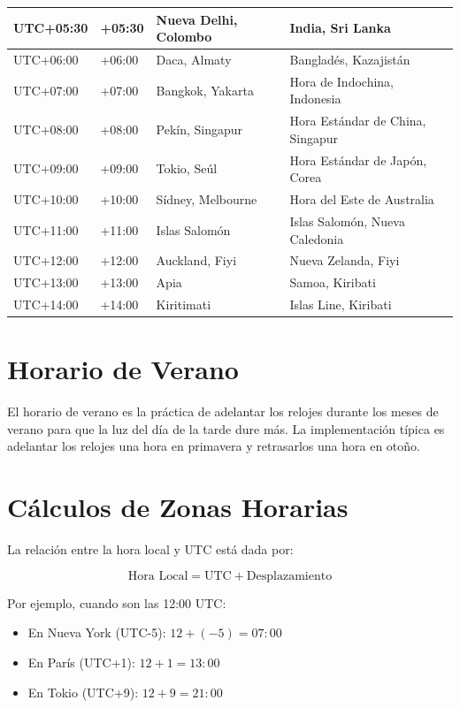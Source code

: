 \documentclass[12pt]{article}
\begin{document}
\begin{longtable}{|p{3cm}|p{2cm}|p{3cm}|p{5cm}|}
\hline
UTC+05:30 & +05:30 & Nueva Delhi, Colombo & India, Sri Lanka \\
\hline
UTC+06:00 & +06:00 & Daca, Almaty & Bangladés, Kazajistán \\
\hline
UTC+07:00 & +07:00 & Bangkok, Yakarta & Hora de Indochina, Indonesia \\
\hline
UTC+08:00 & +08:00 & Pekín, Singapur & Hora Estándar de China, Singapur \\
\hline
UTC+09:00 & +09:00 & Tokio, Seúl & Hora Estándar de Japón, Corea \\
\hline
UTC+10:00 & +10:00 & Sídney, Melbourne & Hora del Este de Australia \\
\hline
UTC+11:00 & +11:00 & Islas Salomón & Islas Salomón, Nueva Caledonia \\
\hline
UTC+12:00 & +12:00 & Auckland, Fiyi & Nueva Zelanda, Fiyi \\
\hline
UTC+13:00 & +13:00 & Apia & Samoa, Kiribati \\
\hline
UTC+14:00 & +14:00 & Kiritimati & Islas Line, Kiribati \\
\hline
\end{longtable}

\section{Horario de Verano}

El horario de verano es la práctica de adelantar los relojes durante los meses de verano para que la luz del día de la tarde dure más. La implementación típica es adelantar los relojes una hora en primavera y retrasarlos una hora en otoño.

\section{Cálculos de Zonas Horarias}

La relación entre la hora local y UTC está dada por:

\begin{equation}
\text{Hora Local} = \text{UTC} + \text{Desplazamiento}
\end{equation}

Por ejemplo, cuando son las 12:00 UTC:
\begin{itemize}
\item En Nueva York (UTC-5): $12 + (-5) = 07:00$
\item En París (UTC+1): $12 + 1 = 13:00$
\item En Tokio (UTC+9): $12 + 9 = 21:00$
\end{itemize}
\end{document}
